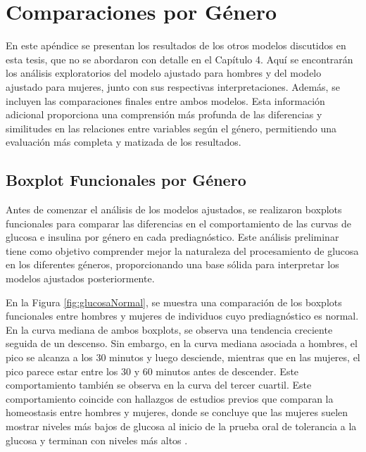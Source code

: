 \appendix

\chapter{Comparaciones por Género}\label{ApendiceA}

En este apéndice se presentan los resultados de los otros modelos discutidos en esta tesis, que no se abordaron con detalle en el Capítulo 4. Aquí se encontrarán los análisis exploratorios del modelo ajustado para hombres y del modelo ajustado para mujeres, junto con sus respectivas interpretaciones. Además, se incluyen las comparaciones finales entre ambos modelos. Esta información adicional proporciona una comprensión más profunda de las diferencias y similitudes en las relaciones entre variables según el género, permitiendo una evaluación más completa y matizada de los resultados.


\section{Boxplot Funcionales por Género}

Antes de comenzar el análisis de los modelos ajustados, se realizaron boxplots funcionales para comparar las diferencias en el comportamiento de las curvas de glucosa e insulina por género en cada prediagnóstico. Este análisis preliminar tiene como objetivo comprender mejor la naturaleza del procesamiento de glucosa en los diferentes géneros, proporcionando una base sólida para interpretar los modelos ajustados posteriormente.

En la Figura \ref{fig:glucosaNormal}, se muestra una comparación de los boxplots funcionales entre hombres y mujeres de individuos cuyo prediagnóstico es normal. En la curva mediana de ambos boxplots, se observa una tendencia creciente seguida de un descenso. Sin embargo, en la curva mediana asociada a hombres, el pico se alcanza a los $30$ minutos y luego desciende, mientras que en las mujeres, el pico parece estar entre los $30$ y $60$ minutos antes de descender. Este comportamiento también se observa en la curva del tercer cuartil. Este comportamiento coincide con hallazgos de estudios previos que comparan la homeostasis entre hombres y mujeres, donde se concluye que las mujeres suelen mostrar niveles más bajos de glucosa al inicio de la prueba oral de tolerancia a la glucosa y terminan con niveles más altos \cite{GenderDifferences2018}.

